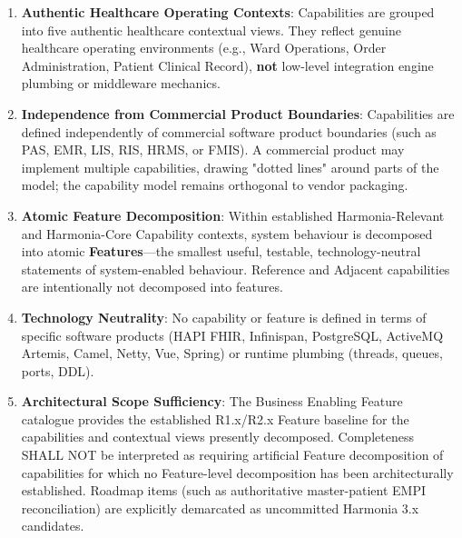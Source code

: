 \begin{enumerate}

\item 
\textbf{Authentic Healthcare Operating Contexts}: Capabilities are grouped into five authentic healthcare contextual views. They reflect genuine healthcare operating environments (e.g., Ward Operations, Order Administration, Patient Clinical Record), \textbf{not} low-level integration engine plumbing or middleware mechanics.



\item 
\textbf{Independence from Commercial Product Boundaries}: Capabilities are defined independently of commercial software product boundaries (such as PAS, EMR, LIS, RIS, HRMS, or FMIS). A commercial product may implement multiple capabilities, drawing "dotted lines" around parts of the model; the capability model remains orthogonal to vendor packaging.



\item 
\textbf{Atomic Feature Decomposition}: Within established Harmonia-Relevant and Harmonia-Core Capability contexts, system behaviour is decomposed into atomic \textbf{Features}—the smallest useful, testable, technology-neutral statements of system-enabled behaviour. Reference and Adjacent capabilities are intentionally not decomposed into features.



\item 
\textbf{Technology Neutrality}: No capability or feature is defined in terms of specific software products (HAPI FHIR, Infinispan, PostgreSQL, ActiveMQ Artemis, Camel, Netty, Vue, Spring) or runtime plumbing (threads, queues, ports, DDL).



\item 
\textbf{Architectural Scope Sufficiency}: The Business Enabling Feature catalogue provides the established R1.x/\allowbreak{}R2.x Feature baseline for the capabilities and contextual views presently decomposed. Completeness SHALL NOT be interpreted as requiring artificial Feature decomposition of capabilities for which no Feature-level decomposition has been architecturally established. Roadmap items (such as authoritative master-patient EMPI reconciliation) are explicitly demarcated as uncommitted Harmonia 3.x candidates.



\end{enumerate}
\label{rad:enabling:16}


